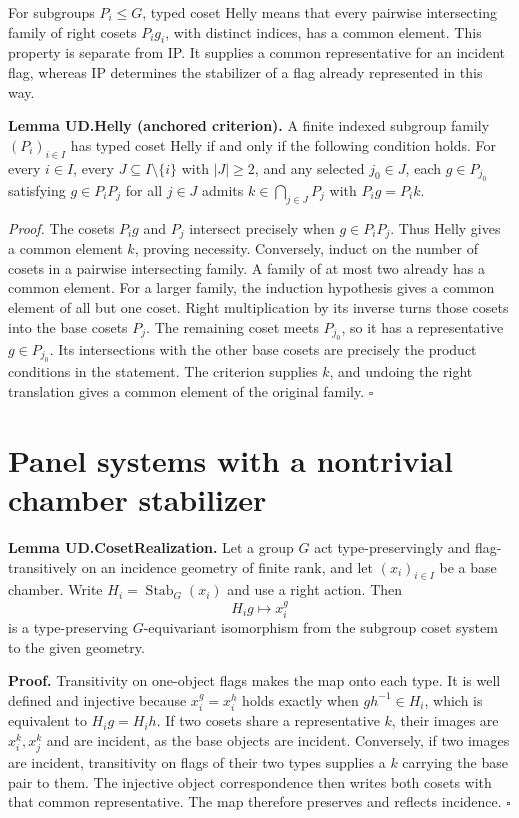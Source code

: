 For subgroups \(P_i\leq G\), typed coset Helly means that every pairwise
intersecting family of right cosets \(P_i g_i\), with distinct indices,
has a common element. This property is separate from IP. It supplies a
common representative for an incident flag, whereas IP determines the
stabilizer of a flag already represented in this way.

\textbf{Lemma UD.Helly (anchored criterion).} A finite indexed subgroup
family \((P_i)_{i\in I}\) has typed coset Helly if and only if the
following condition holds. For every \(i\in I\), every
\(J\subseteq I\setminus\{i\}\) with \(|J|\geq2\), and any selected
\(j_0\in J\), each \(g\in P_{j_0}\) satisfying \(g\in P_iP_j\) for all
\(j\in J\) admits \(k\in\bigcap_{j\in J}P_j\) with \(P_i g=P_i k\).

\emph{Proof.} The cosets \(P_i g\) and \(P_j\) intersect precisely when
\(g\in P_iP_j\). Thus Helly gives a common element \(k\), proving
necessity. Conversely, induct on the number of cosets in a pairwise
intersecting family. A family of at most two already has a common
element. For a larger family, the induction hypothesis gives a common
element of all but one coset. Right multiplication by its inverse turns
those cosets into the base cosets \(P_j\). The remaining coset meets
\(P_{j_0}\), so it has a representative \(g\in P_{j_0}\). Its
intersections with the other base cosets are precisely the product
conditions in the statement. The criterion supplies \(k\), and undoing
the right translation gives a common element of the original family.
\(\square\)

\section{Panel systems with a nontrivial chamber
stabilizer}\label{panel-systems-with-a-nontrivial-chamber-stabilizer}

\textbf{Lemma UD.CosetRealization.} Let a group \(G\) act
type-preservingly and flag-transitively on an incidence geometry of
finite rank, and let \((x_i)_{i\in I}\) be a base chamber. Write
\(H_i=\operatorname{Stab}_G(x_i)\) and use a right action. Then \[
H_i g\longmapsto x_i^g
\] is a type-preserving \(G\)-equivariant isomorphism from the subgroup
coset system to the given geometry.

\textbf{Proof.} Transitivity on one-object flags makes the map onto each
type. It is well defined and injective because \(x_i^g=x_i^h\) holds
exactly when \(gh^{-1}\in H_i\), which is equivalent to \(H_i g=H_i h\).
If two cosets share a representative \(k\), their images are
\(x_i^k,x_j^k\) and are incident, as the base objects are incident.
Conversely, if two images are incident, transitivity on flags of their
two types supplies a \(k\) carrying the base pair to them. The injective
object correspondence then writes both cosets with that common
representative. The map therefore preserves and reflects incidence.
\(\square\)

